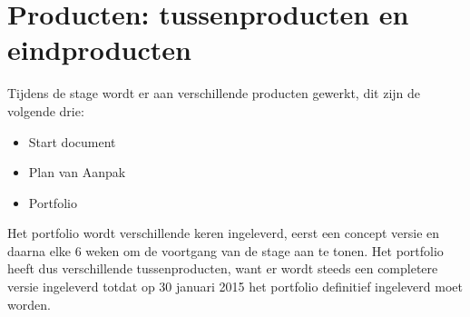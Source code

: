 
\section{Producten: tussenproducten en eindproducten}
Tijdens de stage wordt er aan verschillende producten gewerkt, dit zijn de volgende drie:
\begin{itemize}
\item Start document
\item Plan van Aanpak
\item Portfolio
\end{itemize}
Het portfolio wordt verschillende keren ingeleverd, eerst een concept versie en daarna elke 6 weken om de voortgang van de stage aan te tonen. Het portfolio heeft dus verschillende tussenproducten, want er wordt steeds een completere versie ingeleverd totdat op 30 januari 2015 het portfolio definitief ingeleverd moet worden.

\clearpage

